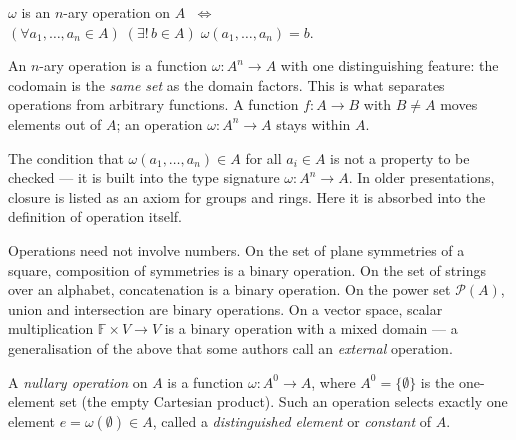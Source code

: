 \begin{remark}
$\omega$ is an $n$-ary operation on $A$
$\;\iff\;$
$(\forall a_1, \ldots, a_n \in A)\;
(\exists!\, b \in A)\;
\omega(a_1, \ldots, a_n) = b$.
\end{remark}

\begin{remark}
An $n$-ary operation is a function $\omega : A^n \to A$ with one
distinguishing feature: the codomain is the \emph{same set} as the
domain factors.
This is what separates operations from arbitrary functions.
A function $f : A \to B$ with $B \neq A$ moves elements out of $A$;
an operation $\omega : A^n \to A$ stays within $A$.
\end{remark}

\begin{remark}
The condition that $\omega(a_1, \ldots, a_n) \in A$ for all
$a_i \in A$ is not a property to be checked — it is built into the
type signature $\omega : A^n \to A$.
In older presentations, closure is listed as an axiom for groups and rings.
Here it is absorbed into the definition of operation itself.
\end{remark}

\begin{remark}
Operations need not involve numbers.
On the set of plane symmetries of a square, composition of symmetries is a
binary operation.
On the set of strings over an alphabet, concatenation is a binary operation.
On the power set $\mathcal{P}(A)$, union and intersection are binary
operations.
On a vector space, scalar multiplication
$\mathbb{F} \times V \to V$ is a binary operation with a mixed domain
— a generalisation of the above that some authors call an \emph{external} operation.
\end{remark}


\begin{tcolorbox}[colback=propbox, colframe=propborder, arc=2pt,
  left=6pt, right=6pt, top=4pt, bottom=4pt,
  title={\small\textbf{Definition (Nullary Operation / Distinguished Element)}},
  fonttitle=\small\bfseries]
\label{def:nullary-op}
A \emph{nullary operation} on $A$ is a function $\omega : A^0 \to A$,
where $A^0 = \{\emptyset\}$ is the one-element set (the empty Cartesian
product).
Such an operation selects exactly one element $e = \omega(\emptyset) \in A$,
called a \emph{distinguished element} or \emph{constant} of $A$.
\end{tcolorbox}


